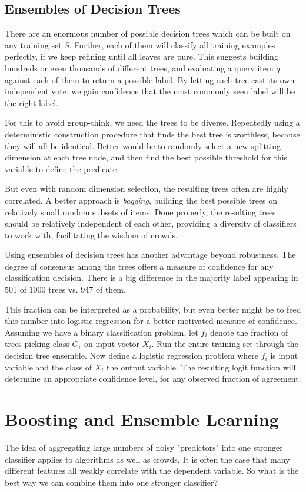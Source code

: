 \documentclass[10pt]{article}
\begin{document}
\begin{enumerate}
\subsection*{Ensembles of Decision Trees}
There are an enormous number of possible decision trees which can be built on any training set $S$. Further, each of them will classify all training examples perfectly, if we keep refining until all leaves are pure. This suggests building hundreds or even thousands of different trees, and evaluating a query item $q$ against each of them to return a possible label. By letting each tree cast its own independent vote, we gain confidence that the most commonly seen label will be the right label.

For this to avoid group-think, we need the trees to be diverse. Repeatedly using a deterministic construction procedure that finds the best tree is worthless, because they will all be identical. Better would be to randomly select a new splitting dimension at each tree node, and then find the best possible threshold for this variable to define the predicate.

But even with random dimension selection, the resulting trees often are highly correlated. A better approach is \textit{bagging}, building the best possible trees on relatively small random subsets of items. Done properly, the resulting trees should be relatively independent of each other, providing a diversity of classifiers to work with, facilitating the wisdom of crowds.

Using ensembles of decision trees has another advantage beyond robustness. The degree of consensus among the trees offers a measure of confidence for any classification decision. There is a big difference in the majority label appearing in 501 of 1000 trees vs. 947 of them.

This fraction can be interpreted as a probability, but even better might be to feed this number into logistic regression for a better-motivated measure of confidence. Assuming we have a binary classification problem, let $f_i$ denote the fraction of trees picking class $C_1$ on input vector $X_i$. Run the entire training set through the decision tree ensemble. Now define a logistic regression problem where $f_i$ is input variable and the class of $X_i$ the output variable. The resulting logit function will determine an appropriate confidence level, for any observed fraction of agreement.

\section*{Boosting and Ensemble Learning}
The idea of aggregating large numbers of noisy "predictors" into one stronger classifier applies to algorithms as well as crowds. It is often the case that many different features all weakly correlate with the dependent variable. So what is the best way we can combine them into one stronger classifier?


\end{enumerate}
\end{document}

